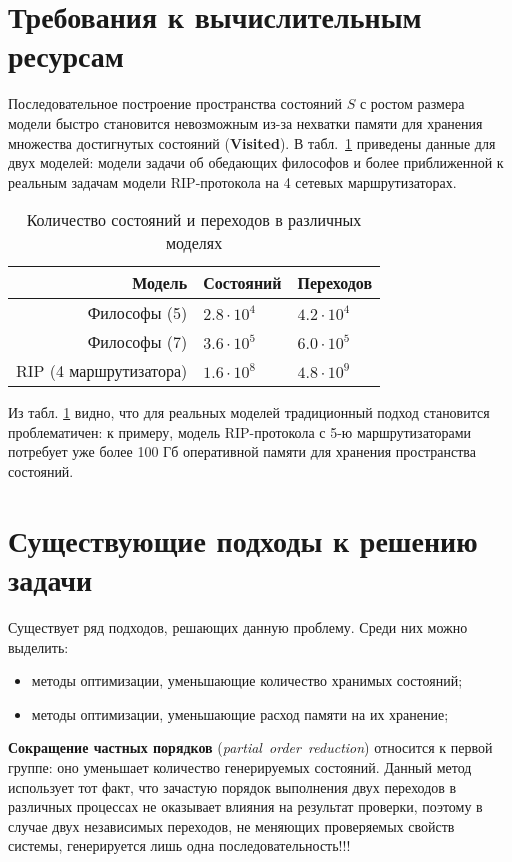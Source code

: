 \documentclass[12pt,a4paper,fleqn]{article}
\newcommand{\Code}[1]{\textbf{\mbox{#1}}}
\newcommand{\Term}[1]{\emph{\mbox{#1}}}
\begin{document}
\section{Требования к вычислительным ресурсам}

Последовательное построение пространства состояний $S$ с ростом размера модели быстро
становится невозможным из-за нехватки памяти для хранения множества достигнутых состояний
(\Code{Visited}). В табл.~\ref{tab:models-statecount} приведены данные для двух моделей:
модели задачи об обедающих философов и более приближенной к реальным задачам модели
RIP-протокола на 4 сетевых маршрутизаторах.

\begin{table}
  \centering
  \begin{tabular}{|r|l|l|}
    \hline
    Модель                  & Состояний         & Переходов       \\
    \hline
    Философы (5)            & $2.8 \cdot 10^4$  & $4.2 \cdot 10^4$ \\
    Философы (7)            & $3.6 \cdot 10^5$  & $6.0 \cdot 10^5$ \\
    RIP (4 маршрутизатора)  & $1.6 \cdot 10^8$  & $4.8 \cdot 10^9$ \\
    \hline
  \end{tabular}
  \caption{Количество состояний и переходов в различных моделях}
\label{tab:models-statecount}
\end{table}

Из табл. \ref{tab:models-statecount} видно, что для реальных моделей традиционный подход
становится проблематичен: к примеру, модель RIP-протокола с 5-ю маршрутизаторами потребует
уже более 100 Гб оперативной памяти для хранения пространства состояний.

\section{Существующие подходы к решению задачи}

Существует ряд подходов, решающих данную проблему. Среди них можно выделить:

\begin{itemize}
\item методы оптимизации, уменьшающие количество хранимых состояний;
\item методы оптимизации, уменьшающие расход памяти на их хранение;
\end{itemize}

\textbf{Сокращение частных порядков} (\Term{partial order reduction}) относится к первой
группе: оно уменьшает количество генерируемых состояний. Данный метод использует тот факт,
что зачастую порядок выполнения двух переходов в различных процессах не оказывает влияния
на результат проверки, поэтому в случае двух независимых переходов, не меняющих
проверяемых свойств системы, генерируется лишь одна последовательность!!!
\end{document}
